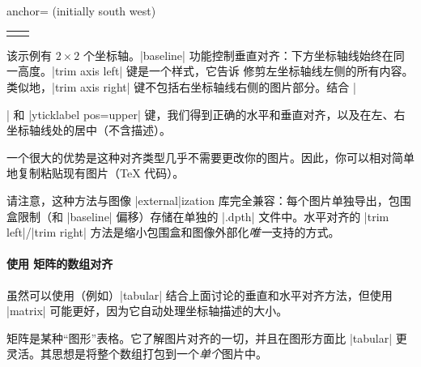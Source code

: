 \begin{pgfplotskey}{anchor= (initially south west)}
\begin{minipage}
\begin{tabular}
\begin{codeexample}[vbox]
\begin{center}
\begin{tabular}{rl}
\begin{tikzpicture}[baseline,trim axis right]
    \end{tikzpicture}
        \\
\end{tabular}
\end{center}
\end{codeexample}
    \noindent 该示例有 $2 \times 2$ 个坐标轴。|baseline| 功能控制垂直对齐：下方坐标轴线始终在同一高度。|trim axis left| 键是一个样式，它告诉 \Tikz{} 修剪左坐标轴线左侧的所有内容。类似地，|trim axis right| 键不包括右坐标轴线右侧的图片部分。结合 |\begin{center}| 和 |yticklabel pos=upper| 键，我们得到正确的水平和垂直对齐，以及在左、右坐标轴线处的居中（不含描述）。

    一个很大的优势是这种对齐类型几乎不需要更改你的图片。因此，你可以相对简单地复制粘贴现有图片（\TeX{} 代码）。

    请注意，这种方法与图像 |external|ization 库完全兼容：每个图片单独导出，包围盒限制（和 |baseline| 偏移）存储在单独的 |.dpth| 文件中。水平对齐的 |trim left|/|trim right| 方法是缩小包围盒和图像外部化\emph{唯一}支持的方式。


    \paragraph{使用 \Tikz{} 矩阵的数组对齐}

    虽然可以使用（例如）|tabular| 结合上面讨论的垂直和水平对齐方法，但使用 \Tikz{} |matrix| 可能更好，因为它自动处理坐标轴描述的大小。

    \Tikz{} 矩阵是某种“图形”表格。它了解图片对齐的一切，并且在图形方面比 |tabular| 更灵活。其思想是将整个数组打包到一个\emph{单个}图片中。


\end{center}
\end{tabular}
\end{minipage}
\end{pgfplotskey}
